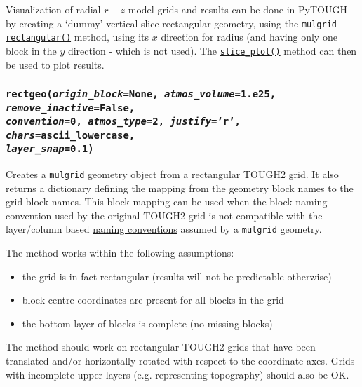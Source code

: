Visualization of radial $r-z$ model grids and results can be done in PyTOUGH by creating a `dummy' vertical slice rectangular geometry, using the \texttt{mulgrid} \hyperref[sec:mulgrid:rectangular]{\texttt{rectangular()}} method, using its $x$ direction for radius (and having only one block in the $y$ direction - which is not used).  The \hyperref[sec:mulgrid:slice_plot]{\texttt{slice\_plot()}} method can then be used to plot results.

\begin{snugshade}
\subsubsection{\texttt{rectgeo(\emph{origin\_block}=None, \emph{atmos\_volume}=1.e25, \emph{remove\_inactive}=False,\\
    \emph{convention}=0, \emph{atmos\_type}=2, \emph{justify}='r', \emph{chars}=ascii\_lowercase,\\
    \emph{layer\_snap}=0.1)}}
\end{snugshade}
\label{sec:t2grid:rectgeo}

Creates a \hyperref[mulgrids]{\texttt{mulgrid}} geometry object from a rectangular TOUGH2 grid. It also returns a dictionary defining the mapping from the geometry block names to the grid block names. This block mapping can be used when the block naming convention used by the original TOUGH2 grid is not compatible with the layer/column based \hyperref[geometry_format_conventions]{naming conventions} assumed by a \texttt{mulgrid} geometry.

The method works within the following assumptions:
\begin{itemize}
  \item the grid is in fact rectangular (results will not be predictable otherwise)
  \item block centre coordinates are present for all blocks in the grid
  \item the bottom layer of blocks is complete (no missing blocks)
\end{itemize}

The method should work on rectangular TOUGH2 grids that have been translated and/or horizontally rotated with respect to the coordinate axes. Grids with incomplete upper layers (e.g. representing topography) should also be OK.

